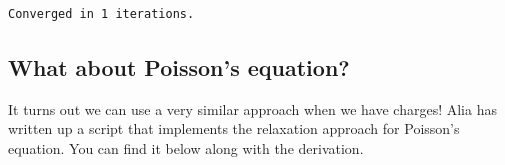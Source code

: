 \begin{Shaded}
\begin{Highlighting}[]

\OperatorTok{=} 
\OperatorTok{=} 
\OperatorTok{=} 
\OperatorTok{=} \OperatorTok{/}

\OperatorTok{=}\OperatorTok{+}\NormalTok{)}

\OperatorTok{=}\OperatorTok{+}\NormalTok{)}
\OperatorTok{=}  \OperatorTok{*} \OperatorTok{*}\OperatorTok{*}

\NormalTok{, }\NormalTok{)}
\NormalTok{, }\NormalTok{)}
\NormalTok{, }\NormalTok{)}

\OperatorTok{=}
\NormalTok{(}\SpecialCharTok{\{}\SpecialCharTok{\}}\NormalTok{)}
\end{Highlighting}
\end{Shaded}

\begin{verbatim}
Converged in 1 iterations.
\end{verbatim}

\subsection{What about Poisson's
equation?}\label{what-about-poissons-equation}

It turns out we can use a very similar approach when we have charges!
Alia has written up a script that implements the relaxation approach for
Poisson's equation. You can find it below along with the derivation.

